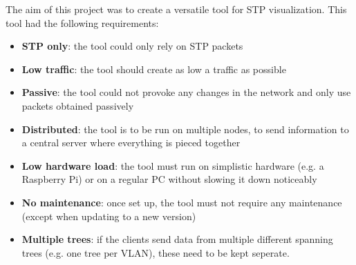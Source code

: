 The aim of this project was to create a versatile tool for STP visualization.
This tool had the following requirements:
\begin{itemize}
    \item \textbf{STP only}: the tool could only rely on STP packets
    \item \textbf{Low traffic}: the tool should create as low a traffic as possible
    \item \textbf{Passive}: the tool could not provoke any changes in the network and only use packets obtained passively
    \item \textbf{Distributed}: the tool is to be run on multiple nodes, to send information to a central server where everything is pieced together
    \item \textbf{Low hardware load}: the tool must run on simplistic hardware (e.g. a Raspberry Pi) or on a regular PC without slowing it down noticeably
    \item \textbf{No maintenance}: once set up, the tool must not require any maintenance (except when updating to a new version)
    \item \textbf{Multiple trees}: if the clients send data from multiple different spanning trees (e.g. one tree per VLAN), these need to be kept seperate.
    \label{requirements}
\end{itemize}

